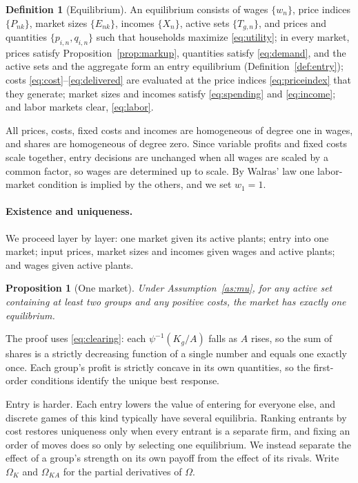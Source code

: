 \documentclass[11pt]{article}
\newtheorem{proposition}{Proposition}
\theoremstyle{definition}
\newtheorem{definition}{Definition}
\theoremstyle{remark}
\begin{document}
\begin{definition}[Equilibrium]\label{def:eq}
An equilibrium consists of wages $\{w_n\}$, price indices $\{P_{nk}\}$, market sizes
$\{E_{nk}\}$, incomes $\{X_n\}$, active sets $\{T_{g,n}\}$, and prices and quantities
$\{p_{i,n},q_{i,n}\}$ such that households maximize \eqref{eq:utility}; in every market,
prices satisfy Proposition~\ref{prop:markup}, quantities satisfy \eqref{eq:demand}, and
the active sets and the aggregate form an entry equilibrium (Definition~\ref{def:entry});
costs \eqref{eq:cost}--\eqref{eq:delivered} are evaluated at the price indices
\eqref{eq:priceindex} that they generate; market sizes and incomes satisfy
\eqref{eq:spending} and \eqref{eq:income}; and labor markets clear, \eqref{eq:labor}.
\end{definition}

\noindent All prices, costs, fixed costs and incomes are homogeneous of degree one in
wages, and shares are homogeneous of degree zero. Since variable profits and fixed
costs scale together, entry decisions are unchanged when all wages are scaled by a
common factor, so wages are determined up to scale. By Walras' law one labor-market
condition is implied by the others, and we set $w_1=1$.

\paragraph{Existence and uniqueness.} We proceed layer by layer: one market given its
active plants; entry into one market; input prices, market sizes and incomes given
wages and active plants; and wages given active plants.

\begin{proposition}[One market]\label{prop:market}
Under Assumption~\ref{as:mu}, for any active set containing at least two groups and
any positive costs, the market has exactly one equilibrium.
\end{proposition}

\noindent The proof uses \eqref{eq:clearing}: each $\psi^{-1}(K_g/A)$ falls as $A$
rises, so the sum of shares is a strictly decreasing function of a single number and
equals one exactly once. Each group's profit is strictly concave in its own quantities,
so the first-order conditions identify the unique best response.

Entry is harder. Each entry lowers the value of entering for everyone else, and
discrete games of this kind typically have several equilibria. Ranking entrants by cost
restores uniqueness only when every entrant is a separate firm, and fixing an order of
moves does so only by selecting one equilibrium. We instead separate the effect of a
group's strength on its own payoff from the effect of its rivals. Write $\Omega_K$ and
$\Omega_{KA}$ for the partial derivatives of $\Omega$.
\end{document}
